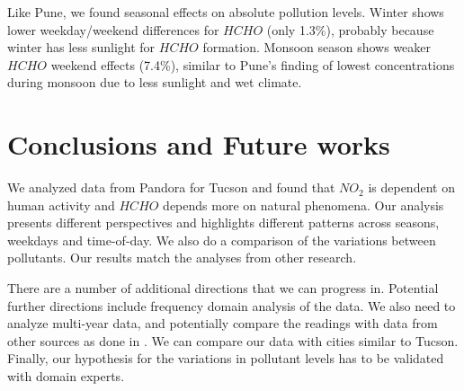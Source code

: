 \documentclass{article}
\begin{document}
Like Pune, we found seasonal effects on absolute pollution levels. Winter shows lower weekday/weekend differences for $HCHO$ (only 1.3\%), probably because winter has less sunlight for $HCHO$ formation. Monsoon season shows weaker $HCHO$ weekend effects (7.4\%), similar to Pune's finding of lowest concentrations during monsoon due to less sunlight and wet climate. 

\section{Conclusions and Future works}

We analyzed data from Pandora for Tucson and found that $NO_2$ is dependent on human activity and $HCHO$ depends more on natural phenomena. Our analysis presents different perspectives and highlights different patterns across seasons, weekdays and time-of-day. We also do a comparison of the variations between pollutants. Our results match the analyses from other research.

There are a number of additional directions that we can progress in. Potential further directions include frequency domain analysis of the data. We also need to analyze multi-year data, and potentially compare the readings with data from other sources as done in \cite{HM2025}. We can compare our data with cities similar to Tucson. Finally, our hypothesis for the variations in pollutant levels has to be validated with domain experts.

    \printbibliography
\end{document}
